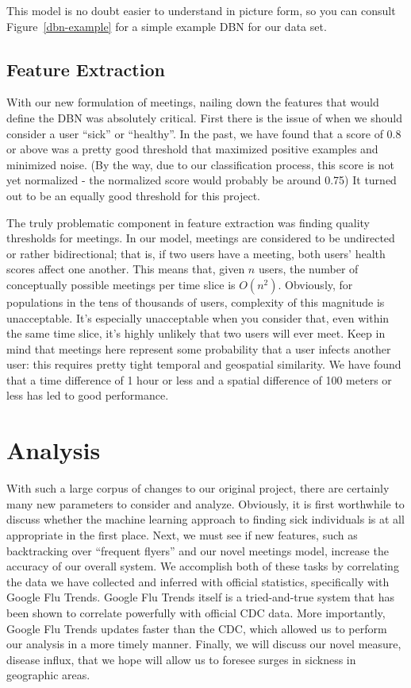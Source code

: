 \documentclass[11pt, letterpaper]{article}
\begin{document}
                This model is no doubt easier to understand in picture form, so you can consult Figure~\ref{dbn-example} for a simple example DBN for our data set.

        \subsection{Feature Extraction}
            With our new formulation of meetings, nailing down the features that would define the DBN was absolutely critical. First there is the issue of when we should consider a user ``sick'' or ``healthy''. In the past, we have found that a score of 0.8 or above was a pretty good threshold that maximized positive examples and minimized noise. (By the way, due to our classification process, this score is not yet normalized - the normalized score would probably be around 0.75) It turned out to be an equally good threshold for this project.

            The truly problematic component in feature extraction was finding quality thresholds for meetings. In our model, meetings are considered to be undirected or rather bidirectional; that is, if two users have a meeting, both users' health scores affect one another. This means that, given $n$ users, the number of conceptually possible meetings per time slice is $O(n^2)$. Obviously, for populations in the tens of thousands of users, complexity of this magnitude is unacceptable. It's especially unacceptable when you consider that, even within the same time slice, it's highly unlikely that two users will ever meet. Keep in mind that meetings here represent some probability that a user infects another user: this requires pretty tight temporal and geospatial similarity. We have found that a time difference of 1 hour or less and a spatial difference of 100 meters or less has led to good performance.

    \section{Analysis}
        With such a large corpus of changes to our original project, there are certainly many new parameters to consider and analyze. Obviously, it is first worthwhile to discuss whether the machine learning approach to finding sick individuals is at all appropriate in the first place. Next, we must see if new features, such as backtracking over ``frequent flyers'' and our novel meetings model, increase the accuracy of our overall system. We accomplish both of these tasks by correlating the data we have collected and inferred with official statistics, specifically with Google Flu Trends. Google Flu Trends itself is a tried-and-true system that has been shown to correlate powerfully with official CDC data. More importantly, Google Flu Trends updates faster than the CDC, which allowed us to perform our analysis in a more timely manner. Finally, we will discuss our novel measure, disease influx, that we hope will allow us to foresee surges in sickness in geographic areas.
\end{document}
